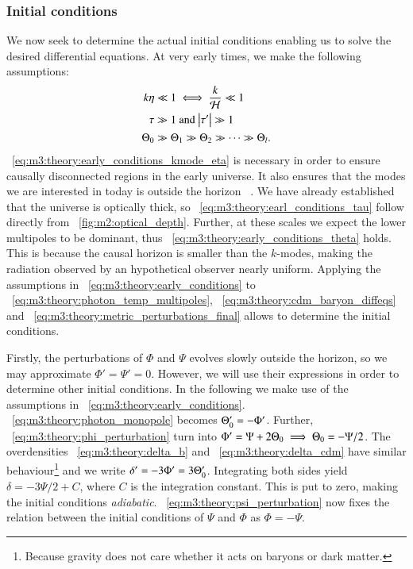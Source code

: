 \subsubsection{Initial conditions}
        We now seek to determine the actual initial conditions enabling us to solve the desired differential equations. At very early times, we make the following assumptions:
        \begin{subequations}\label{eq:m3:theory:early_conditions}
            \begin{align}
                k\eta &\ll 1 \iff \frac{k}{\mathcal{H}}\ll1\label{eq:m3:theory:early_conditions_kmode_eta}\\
                \tau &\gg 1 \text{ and } \abs{\tau'}\gg1 \label{eq:m3:theory:earl_conditions_tau} \\
                \Theta_0&\gg\Theta_1\gg\Theta_2\gg\dots\gg\Theta_l \label{eq:m3:theory:early_conditions_theta}.
            \end{align}
        \end{subequations}
        ~\cref{eq:m3:theory:early_conditions_kmode_eta} is necessary in order to ensure causally disconnected regions in the early universe. It also ensures that the modes we are interested in today is outside the horizon ~\cite{AST5220LectureNotes}. We have already established that the universe is optically thick, so ~\cref{eq:m3:theory:earl_conditions_tau} follow directly from ~\cref{fig:m2:optical_depth}. Further, at these scales we expect the lower multipoles to be dominant, thus ~\cref{eq:m3:theory:early_conditions_theta} holds. This is because the causal horizon is smaller than the $k$-modes, making the radiation observed by an hypothetical observer nearly uniform. Applying the assumptions in ~\cref{eq:m3:theory:early_conditions} to ~\cref{eq:m3:theory:photon_temp_multipoles}, ~\cref{eq:m3:theory:cdm_baryon_diffeqs} and ~\cref{eq:m3:theory:metric_perturbations_final} allows to determine the initial conditions. 

        Firstly, the perturbations of $\Phi$ and $\Psi$ evolves slowly outside the horizon, so we may approximate $\Phi'=\Psi'=0$. However, we will use their expressions in order to determine other initial conditions. In the following we make use of the assumptions in ~\cref{eq:m3:theory:early_conditions}. ~\cref{eq:m3:theory:photon_monopole} becomes $\Theta_0'=-\Phi'$. Further, ~\cref{eq:m3:theory:phi_perturbation} turn into $\Phi'=\Psi+2\Theta_0 \implies \Theta_0=-\Psi/2$. The overdensities ~\cref{eq:m3:theory:delta_b} and ~\cref{eq:m3:theory:delta_cdm} have similar behaviour\footnote{Because gravity does not care whether it acts on baryons or dark matter.} and we write $\delta'=-3\Phi' = 3\Theta_0'$. Integrating both sides yield $\delta=-3\Psi/2 + C$, where $C$ is the integration constant. This is put to zero, making the initial conditions \textit{adiabatic}. ~\cref{eq:m3:theory:psi_perturbation} now fixes the relation between the initial conditions of $\Psi$ and $\Phi$ as $\Phi = -\Psi$. 


